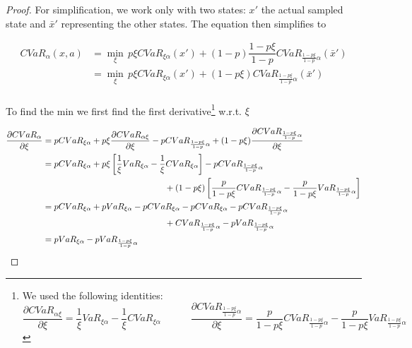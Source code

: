 \begin{proof}
For simplification, we work only with two states: $x'$ the actual sampled state and $\bar{x}'$ representing the other states. The equation then simplifies to

\begin{equation}\label{eq:cvardecomp2}
\begin{split}
CVaR_\alpha(x, a)&=\min_{\xi} \, p\xi CVaR_{\xi\alpha}(x') + (1-p)\dfrac{1-p\xi}{1-p}CVaR_{\frac{1-p\xi}{1-p}\alpha}(\bar{x}')\\
&=\min_{\xi} \, p\xi CVaR_{\xi\alpha}(x') + (1-p\xi)CVaR_{\frac{1-p\xi}{1-p}\alpha}(\bar{x}')\\
\end{split}
\end{equation}

To find the min we first find the first derivative\footnote{
We used the following identities:
\begin{equation*}
\dfrac{\partial CVaR_{\alpha\xi}}{\partial \xi} = \frac{1}{\xi}VaR_{\xi\alpha}-\frac{1}{\xi}CVaR_{\xi\alpha}\quad\quad\quad
\dfrac{\partial CVaR_{\frac{1-p\xi}{1-p}\alpha}}{\partial\xi} = \frac{p}{1-p\xi}CVaR_{\frac{1-p\xi}{1-p}\alpha}	-	\frac{p}{1-p\xi}VaR_{\frac{1-p\xi}{1-p}\alpha}
\end{equation*}
} w.r.t. $\xi$

\begin{equation}
\begin{split}
\dfrac{\partial CVaR_\alpha}{\partial \xi} &= pCVaR_{\xi\alpha} + p\xi \dfrac{\partial CVaR_{\alpha\xi}}{\partial \xi} - pCVaR_{\frac{1-p\xi}{1-p}\alpha} + (1 - p\xi)\dfrac{\partial CVaR_{\frac{1-p\xi}{1-p}\alpha}}{\partial\xi}\\
&= pCVaR_{\xi\alpha} + p\xi\left[	\frac{1}{\xi}VaR_{\xi\alpha}-\frac{1}{\xi}CVaR_{\xi\alpha}	\right] - pCVaR_{\frac{1-p\xi}{1-p}\alpha} \\&\hspace*{5cm} + (1-p\xi)\left[	\frac{p}{1-p\xi}CVaR_{\frac{1-p\xi}{1-p}\alpha}	-	\frac{p}{1-p\xi}VaR_{\frac{1-p\xi}{1-p}\alpha}\right]\\
&= pCVaR_{\xi\alpha} + pVaR_{\xi\alpha} - pCVaR_{\xi\alpha} - pCVaR_{\xi\alpha} - pCVaR_{\frac{1-p\xi}{1-p}\alpha} \\&\hspace*{5cm} + CVaR_{\frac{1-p\xi}{1-p}\alpha} - pVaR_{\frac{1-p\xi}{1-p}\alpha}\\
&= pVaR_{\xi\alpha} - pVaR_{\frac{1-p\xi}{1-p}\alpha}
\end{split}
\end{equation}


\end{proof}
